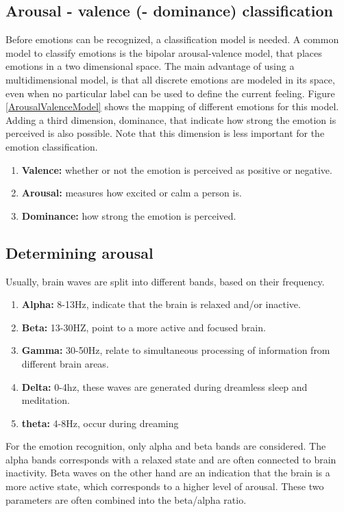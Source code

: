 \subsection{Arousal - valence (- dominance) classification}
Before emotions can be recognized, a classification model is needed. A common model to classify emotions is the bipolar arousal-valence model\cite{ExtendedPaper}\cite{RealTimeEEGEmotion}, that places emotions in a two dimensional space. The main advantage of using a multidimensional model, is that all discrete emotions are modeled in its space, even when no particular label can be used to define the current feeling. Figure \ref{ArousalValenceModel} shows the mapping of different emotions for this model. Adding a third dimension, dominance, that indicate how strong the emotion is perceived is also possible\cite{EEGDatasets}. Note that this dimension is less important for the emotion classification.
\begin{enumerate}
\item \textbf{Valence:} whether or not the emotion is perceived as positive or negative.
\item \textbf{Arousal:} measures how excited or calm a person is.
\item \textbf{Dominance:} how strong the emotion is perceived.
\end{enumerate}


\subsection{Determining arousal}
Usually, brain waves are split into different bands, based on their frequency\cite{EmotionRelativePower}\cite{WavesSite}.
\begin{enumerate}
\item \textbf{Alpha:} 8-13Hz, indicate that the brain is relaxed and/or inactive.
\item \textbf{Beta:} 13-30HZ, point to a more active and focused brain.
\item \textbf{Gamma:} 30-50Hz, relate to simultaneous processing of information from different brain areas.
\item \textbf{Delta:} 0-4hz, these waves are generated during dreamless sleep and meditation.
\item \textbf{theta:} 4-8Hz, occur during dreaming
\end{enumerate}
For the emotion recognition, only alpha and beta bands are considered. The alpha bands corresponds with a relaxed state and are often connected to brain inactivity\cite{ExtendedPaper}\cite{RealTimeEEGEmotion}. Beta waves on the other hand are an indication that the brain is a more active state, which corresponds to a higher level of arousal. These two parameters are often combined into the beta/alpha ratio.

